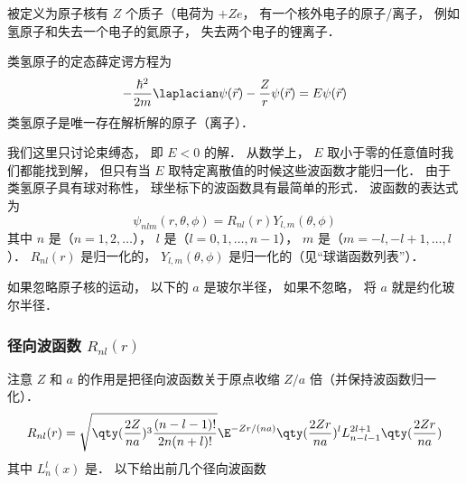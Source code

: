 

 被定义为原子核有 $Z$ 个质子（电荷为 $+Ze$， 有一个核外电子的原子/离子， 例如氢原子和失去一个电子的氦原子， 失去两个电子的锂离子． %

类氢原子的定态薛定谔方程为
\begin{equation}\label{HWF_eq1}
-\frac{\hbar^2}{2m} \laplacian \psi(\vec r) - \frac{Z}{r} \psi(\vec r) = E \psi(\vec r)
\end{equation}
类氢原子是唯一存在解析解的原子（离子）．

我们这里只讨论束缚态， 即 $E < 0$ 的解．  从数学上， $E$ 取小于零的任意值时我们都能找到解， 但只有当 $E$ 取特定离散值的时候这些波函数才能归一化． 由于类氢原子具有球对称性， 球坐标下的波函数具有最简单的形式． 波函数的表达式为
\begin{equation}\label{HWF_eq3}
\psi_{nlm} (r,\theta ,\phi) = R_{nl}(r) Y_{l,m}(\theta, \phi)
\end{equation}
其中 $n$ 是（$n = 1, 2, \dots$）， $l$ 是（$l = 0, 1, \dots, n - 1$）， $m$ 是（$m = -l, -l+1, \dots, l$）． $R_{nl}(r)$ 是归一化的， $Y_{l,m}(\theta, \phi)$ 是归一化的（见“球谐函数列表”）．

如果忽略原子核的运动， 以下的 $a$ 是玻尔半径， 如果不忽略， 将 $a$ 就是约化玻尔半径．%

\subsubsection{径向波函数 $R_{nl}(r)$}

注意 $Z$ 和 $a$ 的作用是把径向波函数关于原点收缩 $Z/a$ 倍（并保持波函数归一化）．
\begin{equation}\label{HWF_eq2}
R_{nl}(r) = \sqrt{\qty(\frac{2 Z}{na})^3 \frac{(n - l - 1)!}{2n (n + l)!}} \E^{-Zr/(na)} \qty(\frac{2Zr}{na})^l  L_{n-l-1}^{2l+1}\qty(\frac{2Zr}{na})
\end{equation}
其中 $L_n^l(x)$ 是． 以下给出前几个径向波函数

